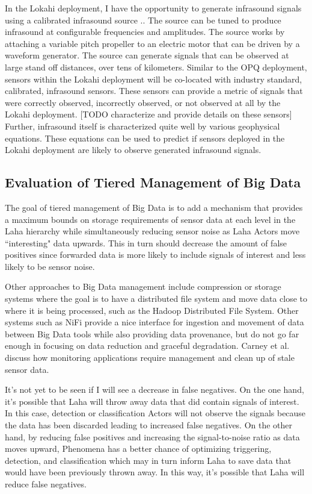 In the Lokahi deployment, I have the opportunity to generate infrasound signals using a calibrated infrasound source \cite{park2009rotary}.. The source can be tuned to produce infrasound at configurable frequencies and amplitudes. The source works by attaching a variable pitch propeller to an electric motor that can be driven by a waveform generator. The source can generate signals that can be observed at large stand off distances, over tens of kilometers. Similar to the OPQ deployment, sensors within the Lokahi deployment will be co-located with industry standard, calibrated, infrasound sensors. These sensors can provide a metric of signals that were correctly observed, incorrectly observed, or not observed at all by the Lokahi deployment. [TODO characterize and provide details on these sensors] Further, infrasound itself is characterized quite well by various geophysical equations. These equations can be used to predict if sensors deployed in the Lokahi deployment are likely to observe generated infrasound signals.

\subsection{Evaluation of Tiered Management of Big Data}\label{eval-big-data}
The goal of tiered management of Big Data is to add a mechanism that provides a maximum bounds on storage requirements of sensor data at each level in the Laha hierarchy while simultaneously reducing sensor noise as Laha Actors move ``interesting" data upwards. This in turn should decrease the amount of false positives since forwarded data is more likely to include signals of interest and less likely to be sensor noise. 

Other approaches to Big Data management include compression\cite{tang2004compression} or storage systems where the goal is to have a distributed file system and move data close to where it is being processed, such as the Hadoop Distributed File System\cite{warrier2007much}. Other systems such as NiFi\cite{hughes2016survey} provide a nice interface for ingestion and movement of data between Big Data tools while also providing data provenance, but do not go far enough in focusing on data reduction and graceful degradation. Carney et al.\cite{carney2002monitoring} discuss how monitoring applications require management and clean up of stale sensor data.

It's not yet to be seen if I will see a decrease in false negatives. On the one hand, it's possible that Laha will throw away data that did contain signals of interest. In this case, detection or classification Actors will not observe the signals because the data has been discarded leading to increased false negatives. On the other hand, by reducing false positives and increasing the signal-to-noise ratio as data moves upward, Phenomena has a better chance of optimizing triggering, detection, and classification which may in turn inform Laha to save data that would have been previously thrown away. In this way, it's possible that Laha will reduce false negatives.

